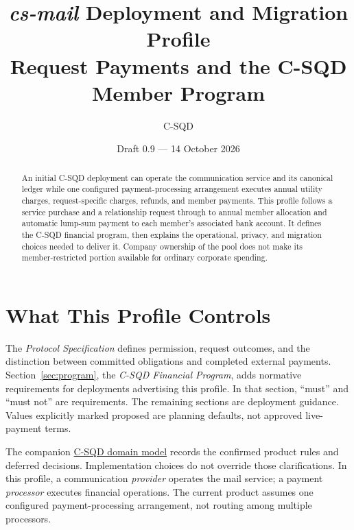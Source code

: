 \documentclass[11pt]{article}
\title{\textit{cs-mail} Deployment and Migration Profile\\\large Request Payments and the C-SQD Member Program}
\author{C-SQD}
\date{Draft 0.9 --- 14 October 2026}
\begin{document}
\maketitle

\begin{abstract}
An initial C-SQD deployment can operate the communication service and its
canonical ledger while one configured payment-processing arrangement executes annual utility charges,
request-specific charges, refunds, and member payments. This profile follows
a service purchase and a relationship request through to annual member allocation
and automatic lump-sum payment to each member's associated bank account. It defines the
C-SQD financial program, then explains the operational, privacy, and migration
choices needed to deliver it. Company ownership of the pool does not make its
member-restricted portion available for ordinary corporate spending.
\end{abstract}

\medskip\noindent{}\medskip

\section{What This Profile Controls}

The \textit{Protocol Specification} defines permission, request outcomes, and
the distinction between committed obligations and completed external payments.
Section~\ref{sec:program}, the \emph{C-SQD Financial Program}, adds normative
requirements for deployments advertising this profile. In that section,
``must'' and ``must not'' are requirements. The remaining sections are deployment
guidance. Values explicitly marked proposed are planning defaults, not approved
live-payment terms.

The companion \href{DOMAIN_MODEL.md}{C-SQD domain model} records the confirmed
product rules and deferred decisions. Implementation choices do not override
those clarifications. In this profile, a communication
\emph{provider} operates the mail service; a payment \emph{processor} executes
financial operations. The current product assumes one configured
payment-processing arrangement, not routing among multiple processors.
\end{document}
